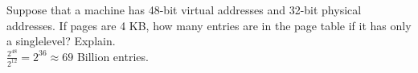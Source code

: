 \documentclass[12pt]{article}
\newenvironment{problem}[2][Problem]{\begin{trivlist}
\item[\hskip \labelsep {\bfseries #1}\hskip \labelsep {\bfseries #2.}]}{\end{trivlist}}
\begin{document}
\begin{problem}{7}
  Suppose that a machine has 48-bit virtual addresses and 32-bit physical
addresses. If pages are 4 KB, how many entries are in the page table if it has only a singlelevel? Explain.\\
$\frac{2^{48}}{2^{12}} = 2^{36} \approx 69$ Billion entries.
\end{problem}
 
\end{document}
